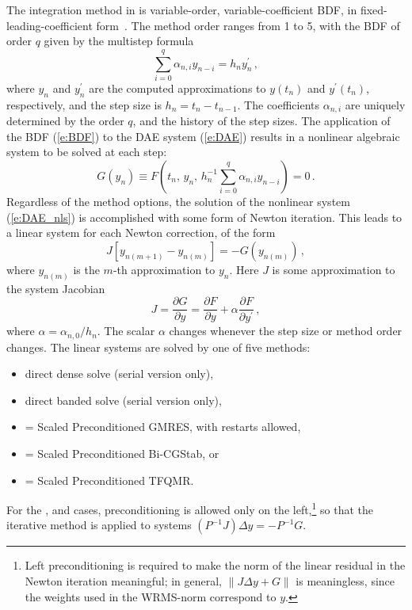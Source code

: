 The integration method in {\ida} is variable-order, variable-coefficient
BDF, in fixed-leading-coefficient form~\cite{BCP:96}.
The method order ranges from 1 to 5, with the BDF of order $q$
given by the multistep formula
\begin{equation}\label{e:BDF}
  \sum_{i=0}^q \alpha_{n,i}y_{n-i} = h_n y^\prime_n \, ,
\end{equation}
where $y_n$ and $y^\prime_n$ are the computed approximations to $y(t_n)$
and $y^\prime(t_n)$, respectively, and the step size is $h_n = t_n - t_{n-1}$.  
The coefficients $\alpha_{n,i}$ are uniquely determined by the order
$q$, and the history of the step sizes.  The application of the BDF
(\ref{e:BDF}) to the DAE system (\ref{e:DAE}) results in a nonlinear
algebraic system to be solved at each step:
\begin{equation}\label{e:DAE_nls}
  G(y_n) \equiv 
  F \left( t_n , \, y_n , \, 
    h_n^{-1} \sum_{i=0}^q \alpha_{n,i}y_{n-i} \right) = 0 \, .
\end{equation}
%
Regardless of the method options, the solution of the nonlinear system
(\ref{e:DAE_nls}) is accomplished with some form of Newton iteration.
This leads to a linear system for each Newton correction, of the form
\begin{equation}\label{e:DAE_Newtoncorr}
  J [y_{n(m+1)} - y_{n(m)}] = -G(y_{n(m)})  \, , 
\end{equation}
where $y_{n(m)}$ is the $m$-th approximation to $y_n$. 
%
Here $J$ is some approximation to the system Jacobian
\begin{equation}\label{e:DAE_Jacobian}
  J = \frac{\partial G}{\partial y}
  = \frac{\partial F}{\partial y} + 
  \alpha\frac{\partial F}{\partial y^\prime} \, ,
\end{equation}
where $\alpha = \alpha_{n,0}/h_n$.  The scalar $\alpha$ changes 
whenever the step size or method order changes.
%
The linear systems are solved by one of five methods:
\begin{itemize}
\item direct dense solve (serial version only),
\item direct banded solve (serial version only),
\item {\spgmr} = Scaled Preconditioned GMRES, with restarts allowed,
\item {\spbcg} = Scaled Preconditioned Bi-CGStab, or
\item {\sptfqmr} = Scaled Preconditioned TFQMR.
\end{itemize}
For the {\spgmr}, {\spbcg} and {\sptfqmr} cases, preconditioning is allowed
only on the left,\footnote{Left preconditioning is required to make the norm of
the linear residual in the Newton iteration meaningful; in general,
$\| J \Delta y + G \|$ is meaningless, since the weights used in 
the WRMS-norm correspond to $y$.}
so that the iterative method is applied to systems $(P^{-1}J)\Delta y = -P^{-1}G$. 

